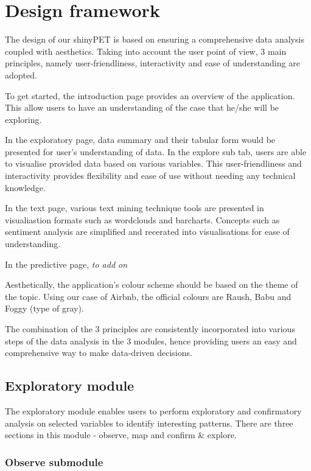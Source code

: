 \documentclass{acm_proc_article-sp}
\begin{document}
\hypertarget{design-framework}{%
\section{Design framework}\label{design-framework}}

The design of our shinyPET is based on ensuring a comprehensive data
analysis coupled with aesthetics. Taking into account the user point of
view, 3 main principles, namely user-friendliness, interactivity and
ease of understanding are adopted.

To get started, the introduction page provides an overview of the
application. This allow users to have an understanding of the case that
he/she will be exploring.

In the exploratory page, data summary and their tabular form would be
presented for user's understanding of data. In the explore sub tab,
users are able to visualise provided data based on various variables.
This user-friendliness and interactivity provides flexibility and ease
of use without needing any technical knowledge.

In the text page, various text mining technique tools are presented in
visualiastion formats such as wordclouds and barcharts. Concepts such as
sentiment analysis are simplified and recerated into visualisations for
ease of understanding.

In the predictive page, \emph{to add on}

Aesthetically, the application's colour scheme should be based on the
theme of the topic. Using our case of Airbnb, the official colours are
Raush, Babu and Foggy (type of gray).

The combination of the 3 principles are consistently incorporated into
various steps of the data analysis in the 3 modules, hence providing
users an easy and comprehensive way to make data-driven decisions.

\hypertarget{exploratory-module}{%
\subsection{Exploratory module}\label{exploratory-module}}

The exploratory module enables users to perform exploratory and
confirmatory analysis on selected variables to identify interesting
patterns. There are three sections in this module - observe, map and
confirm \& explore.

\hypertarget{observe-submodule}{%
\subsubsection{Observe submodule}\label{observe-submodule}}
\end{document}
